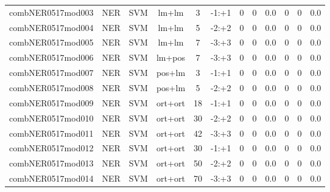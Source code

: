 \documentclass[a4paper]{article}
\begin{document}
\begin{landscape}
\begin{center}
\begin{tabular}{ |c|c|c|c|c|c|c|c|c|c|c|c|}
 
 	
 	\small{ combNER0517mod003 } & NER & SVM & lm+lm  &  3 &  -1:+1  &  0 & 0 & 0.0  &  0 & 0 & 0.0 \\
 	

 
 	
 	\small{ combNER0517mod004 } & NER & SVM & lm+lm  &  5 &  -2:+2  &  0 & 0 & 0.0  &  0 & 0 & 0.0 \\
 	

 
 	
 	\small{ combNER0517mod005 } & NER & SVM & lm+lm  &  7 &  -3:+3  &  0 & 0 & 0.0  &  0 & 0 & 0.0 \\
 	

 
 	
 	\small{ combNER0517mod006 } & NER & SVM & lm+pos  &  7 &  -3:+3  &  0 & 0 & 0.0  &  0 & 0 & 0.0 \\
 	

 
 	
 	\small{ combNER0517mod007 } & NER & SVM & pos+lm  &  3 &  -1:+1  &  0 & 0 & 0.0  &  0 & 0 & 0.0 \\
 	

 
 	
 	\small{ combNER0517mod008 } & NER & SVM & pos+lm  &  5 &  -2:+2  &  0 & 0 & 0.0  &  0 & 0 & 0.0 \\
 	

 
 	
 	\small{ combNER0517mod009 } & NER & SVM & ort+ort  &  18 &  -1:+1  &  0 & 0 & 0.0  &  0 & 0 & 0.0 \\
 	

 
 	
 	\small{ combNER0517mod010 } & NER & SVM & ort+ort  &  30 &  -2:+2  &  0 & 0 & 0.0  &  0 & 0 & 0.0 \\
 	

 
 	
 	\small{ combNER0517mod011 } & NER & SVM & ort+ort  &  42 &  -3:+3  &  0 & 0 & 0.0  &  0 & 0 & 0.0 \\
 	

 
 	
 	\small{ combNER0517mod012 } & NER & SVM & ort+ort  &  30 &  -1:+1  &  0 & 0 & 0.0  &  0 & 0 & 0.0 \\
 	

 
 	
 	\small{ combNER0517mod013 } & NER & SVM & ort+ort  &  50 &  -2:+2  &  0 & 0 & 0.0  &  0 & 0 & 0.0 \\
 	

 
 	
 	\small{ combNER0517mod014 } & NER & SVM & ort+ort  &  70 &  -3:+3  &  0 & 0 & 0.0  &  0 & 0 & 0.0 \\
 	


\end{tabular}
\end{center}
\end{landscape}
\end{document}
